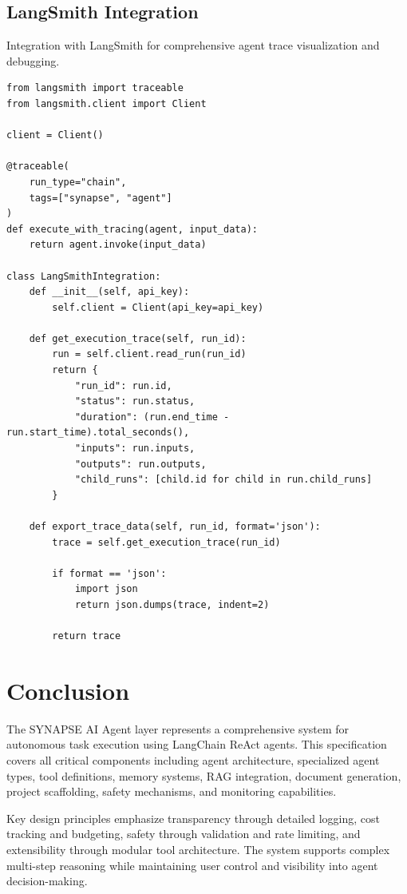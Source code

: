 \documentclass{report}
\begin{document}
\section{LangSmith Integration}

Integration with LangSmith for comprehensive agent trace visualization and debugging.

\begin{lstlisting}
from langsmith import traceable
from langsmith.client import Client

client = Client()

@traceable(
    run_type="chain",
    tags=["synapse", "agent"]
)
def execute_with_tracing(agent, input_data):
    return agent.invoke(input_data)

class LangSmithIntegration:
    def __init__(self, api_key):
        self.client = Client(api_key=api_key)
    
    def get_execution_trace(self, run_id):
        run = self.client.read_run(run_id)
        return {
            "run_id": run.id,
            "status": run.status,
            "duration": (run.end_time - run.start_time).total_seconds(),
            "inputs": run.inputs,
            "outputs": run.outputs,
            "child_runs": [child.id for child in run.child_runs]
        }
    
    def export_trace_data(self, run_id, format='json'):
        trace = self.get_execution_trace(run_id)
        
        if format == 'json':
            import json
            return json.dumps(trace, indent=2)
        
        return trace
\end{lstlisting}

\chapter{Conclusion}

The SYNAPSE AI Agent layer represents a comprehensive system for autonomous task execution using LangChain ReAct agents. This specification covers all critical components including agent architecture, specialized agent types, tool definitions, memory systems, RAG integration, document generation, project scaffolding, safety mechanisms, and monitoring capabilities.

Key design principles emphasize transparency through detailed logging, cost tracking and budgeting, safety through validation and rate limiting, and extensibility through modular tool architecture. The system supports complex multi-step reasoning while maintaining user control and visibility into agent decision-making.
\end{document}
